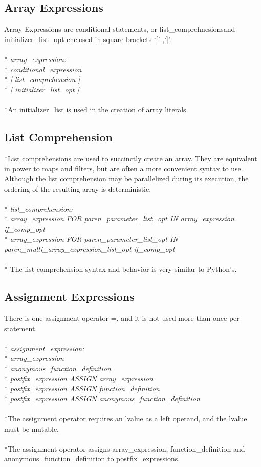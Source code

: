 \subsection{Array Expressions}
Array Expressions are conditional statements, or list\_comprehnesionsand initializer\_list\_opt enclosed in square brackets `[' ,`]'.
\\ \\* \tab \emph{array\_expression:}
\\* \tab \tab \emph{conditional\_expression}
\\* \tab \tab \emph{[ list\_comprehension ]}
\\* \tab \tab \emph{[ initializer\_list\_opt ]}
\\ \\*An initializer\_list is used in the creation of array literals.
\subsection{List Comprehension}
*List comprehensions are used to succinctly create an array. They are equivalent in power to maps and filters, but are often a more convenient syntax to use. Although the list comprehension may be parallelized during its execution, the ordering of the resulting array is deterministic.
\\ \\* \tab \emph{list\_comprehension:}
\\* \tab \tab \emph{array\_expression FOR paren\_parameter\_list\_opt IN array\_expression if\_comp\_opt}
\\* \tab \tab \emph{array\_expression FOR paren\_parameter\_list\_opt IN                               paren\_multi\_array\_expression\_list\_opt if\_comp\_opt}
\\ \\* The list comprehension syntax and behavior is very similar to Python's.

\subsection{Assignment Expressions}
There is one assignment operator =, and it is not used more than once per statement.
\\ \\* \tab \emph{assignment\_expression: }
\\* \tab \tab \emph{array\_expression}
\\* \tab \tab \emph{anonymous\_function\_definition}
\\* \tab \tab \emph{postfix\_expression ASSIGN array\_expression}
\\* \tab \tab \emph{postfix\_expression ASSIGN function\_definition}
\\* \tab \tab \emph{postfix\_expression ASSIGN anonymous\_function\_definition}
\\ \\*The assignment operator requires an lvalue as a left operand, and the lvalue must be mutable.
\\ \\*The assignment operator assigns array\_expression, function\_definition and anonymous\_function\_definition to postfix\_expressions.


